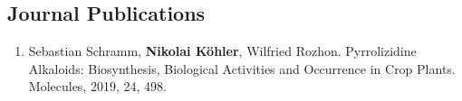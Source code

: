 
\subsection{Journal Publications}

\begin{enumerate}
	\item Sebastian Schramm, \textbf{Nikolai Köhler}, Wilfried Rozhon. Pyrrolizidine Alkaloids: Biosynthesis, Biological Activities and Occurrence in Crop Plants. Molecules, 2019, 24, 498.
	\setcounter{publicationCounter}{\value{enumi}}	%
\end{enumerate}

%


